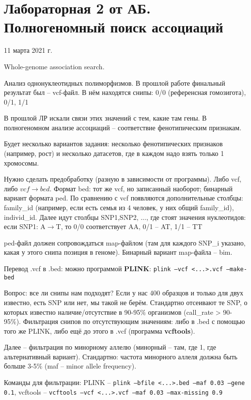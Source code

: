 \documentclass[main.tex]{subfiles}
\begin{document}
\section{Лабораторная 2 от АБ. Полногеномный поиск ассоциаций}
11 марта 2021 г.

Whole-genome association search.

Анализ однонуклеотидных полиморфизмов.
В прошлой работе финальный результат был -- vcf-файл.
В нём находятся снипы: 0/0 (референсная гомозигота), 0/1, 1/1

В прошлой ЛР искали связи этих значений с тем, какие там гены.
В полногеномном анализе ассоциаций -- соответствие фенотипическим признакам.

Будет несколько вариантов задания: несколько фенотипических признаков (например, рост) и несколько датасетов, где в каждом надо взять только 1 хромосомы.

Нужно сделать предобработку (разную в зависимости от программы).
Либо vcf, либо $vcf \to bed$.
Формат bed: тот же vcf, но записанный наоборот; бинарный вариант формата ped.
По сравнению с vcf появляются дополнительные столбцы: family\_id (например, если есть семья из 4 человек, у них общий family\_id), individ\_id.
Далее идут столбцы SNP1,SNP2, ..., где стоят значения нуклеотидов: если SNP1: A$\to$T, то 0/0 соответствует AA, 0/1 -- AT, 1/1 -- TT

ped-файл должен сопровождаться map-файлом (там для каждого SNP\_i указано, какая у этого снипа позиция в геноме).
Бинарный вариант map-файла -- bim.

Перевод .vcf в .bed: можно программой \textbf{PLINK}: \texttt{plink --vcf <...>.vcf --make-bed}

Вопрос: все ли снипы нам подходят?
Если у нас 400 образцов и только для двух известно, есть SNP или нет, мы такой не берём.
Стандартно отсеивают те SNP, о которых известно наличие/отсутствие в 90-95\% организмов (call\_rate > 90-95\%).
Фильтрация снипов по отсутствующим значениям: либо в .bed с помощью того же PLINK, либо ещё до этого в .vcf (программа \textbf{vcftools}).

Далее -- фильтрация по минорному аллелю (минорный -- там, где 1, где альтернативный вариант).
Стандартно: частота минорного аллеля должна быть больше 3-5\% (maf -- minor allele frequency).

Команды для фильтрации: PLINK -- \texttt{plink --bfile <...>.bed --maf 0.03 --gene 0.1}, vcftools -- \texttt{vcftools --vcf <...>.vcf --maf 0.03 --max-missing 0.9} \\
\end{document}
